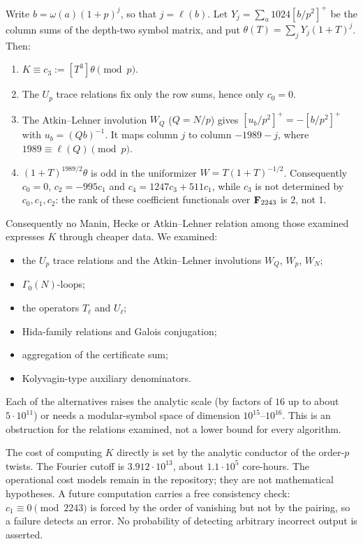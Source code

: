\begin{proposition}\label{prop:compress}
Write $b=\omega(a)(1+p)^j$, so that $j=\ell(b)$. Let $Y_j=\sum_a1024[b/p^2]^+$ be the column sums of the depth-two symbol matrix, and put $\theta(T)=\sum_jY_j(1+T)^j$. Then:
\begin{enumerate}[label=(\roman*)]
\item $K\equiv c_3:=[T^3]\theta\pmod p$.
\item The $U_p$ trace relations fix only the row sums, hence only $c_0=0$.
\item The Atkin--Lehner involution $W_Q$ ($Q=N/p$) gives $[u_b/p^2]^+=-[b/p^2]^+$ with $u_b=(Qb)^{-1}$. It maps column $j$ to column $-1989-j$, where $1989\equiv\ell(Q)\pmod p$.
\item $(1+T)^{1989/2}\theta$ is odd in the uniformizer $W=T(1+T)^{-1/2}$. Consequently $c_0=0$, $c_2=-995c_1$ and $c_4=1247c_3+511c_1$, while $c_3$ is not determined by $c_0,c_1,c_2$: the rank of these coefficient functionals over $\mathbf{F}_{2243}$ is $2$, not $1$.
\end{enumerate}
\end{proposition}
Consequently no Manin, Hecke or Atkin--Lehner relation among those examined expresses $K$ through cheaper data. We examined:
\begin{itemize}[leftmargin=*]
\item the $U_p$ trace relations and the Atkin--Lehner involutions $W_Q$, $W_p$, $W_N$;
\item $\Gamma_0(N)$-loops;
\item the operators $T_\ell$ and $U_\ell$;
\item Hida-family relations and Galois conjugation;
\item aggregation of the certificate sum;
\item Kolyvagin-type auxiliary denominators.
\end{itemize}
Each of the alternatives raises the analytic scale (by factors of $16$ up to about $5\cdot10^{11}$) or needs a modular-symbol space of dimension $10^{15}$--$10^{16}$. This is an obstruction for the relations examined, not a lower bound for every algorithm.

The cost of computing $K$ directly is set by the analytic conductor of the order-$p$ twists. The Fourier cutoff is $3.912\cdot10^{13}$, about $1.1\cdot10^5$ core-hours. The operational cost models remain in the repository; they are not mathematical hypotheses. A future computation carries a free consistency check: $c_1\equiv0\pmod{2243}$ is forced by the order of vanishing but not by the pairing, so a failure detects an error. No probability of detecting arbitrary incorrect output is asserted.

